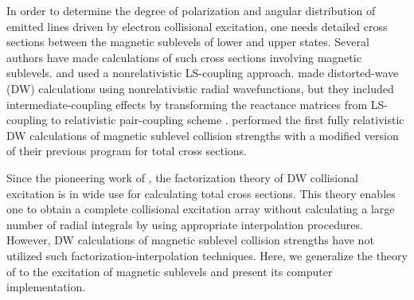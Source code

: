 In order to determine the degree of polarization and angular distribution of
emitted lines driven by electron collisional excitation, one needs detailed
cross sections between the magnetic sublevels of lower and upper states. Several
authors have made calculations of such cross sections involving magnetic
sublevels. \citet{mitroy:1988a} and \citet{mitroy:1988b} used a nonrelativistic
LS-coupling approach. \citet{inal:1987a} made distorted-wave (DW) calculations
using nonrelativistic radial wavefunctions, but they included
intermediate-coupling effects by transforming the reactance matrices from
LS-coupling to relativistic pair-coupling scheme \citep{eissner:1972a,
saraph:1978a}. \citet{zhang:1990b} performed the first fully relativistic DW
calculations of magnetic sublevel collision strengths with a modified version of
their previous program for total cross sections.

Since the pioneering work of \citet{barshalom:1988a}, the factorization theory
of DW collisional excitation is in wide use for calculating total cross
sections. This theory enables one to obtain a complete collisional excitation
array without calculating a large number of radial integrals by using
appropriate interpolation procedures. However, DW calculations of magnetic
sublevel collision strengths have not utilized such factorization-interpolation
techniques. Here, we generalize the theory of \citet{barshalom:1988a}
to the excitation of magnetic sublevels and present its computer implementation.

